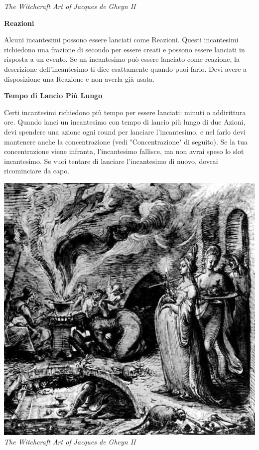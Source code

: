 \begin{multicols}{2}
\textit{The Witchcraft Art of Jacques de Gheyn II}


\textbf{Reazioni}

Alcuni incantesimi possono essere lanciati come Reazioni. Questi incantesimi richiedono una frazione di secondo per essere creati e possono essere lanciati in risposta a un evento. Se un incantesimo può essere lanciato come reazione, la descrizione dell'incantesimo ti dice esattamente quando puoi farlo. Devi avere a disposizione una Reazione e non averla già usata.

\textbf{Tempo di Lancio Più Lungo}

Certi incantesimi richiedono più tempo per essere lanciati: minuti o addirittura ore. Quando lanci un incantesimo con tempo di lancio più lungo di due Azioni, devi spendere una azione ogni round per lanciare l'incantesimo, e nel farlo devi mantenere anche la concentrazione (vedi "Concentrazione" di seguito). Se la tua concentrazione viene infranta, l'incantesimo fallisce, ma non avrai speso lo slot incantesimo. Se vuoi tentare di lanciare l'incantesimo di nuovo, dovrai ricominciare da capo.

\begin{center}
	\includegraphics[width=0.9\linewidth]{immagini/infanticidalwitch.jpg}
	\textit{The Witchcraft Art of Jacques de Gheyn II}
\end{center}

\medskip


\end{multicols}
